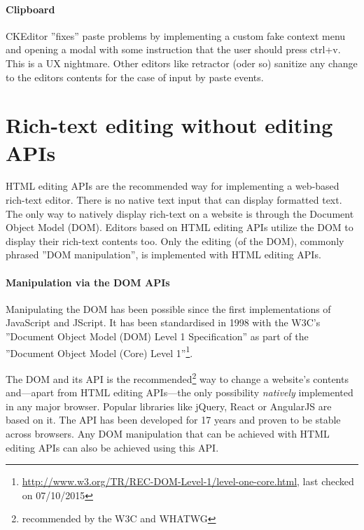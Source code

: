 \paragraph{Clipboard} CKEditor ''fixes'' paste problems by implementing a custom fake context menu and opening a modal with some instruction that the user should press ctrl+v. This is a UX nightmare. Other editors like retractor (oder so) sanitize any change to the editors contents for the case of input by paste events.

\section{Rich-text editing without editing APIs}

HTML editing APIs are the recommended way for implementing a web-based rich-text editor. There is no native text input that can display formatted text. The only way to natively display rich-text on a website is through the Document Object Model (DOM). Editors based on HTML editing APIs utilize the DOM to display their rich-text contents too. Only the editing (of the DOM), commonly phrased ''DOM manipulation'', is implemented with HTML editing APIs.

\paragraph{Manipulation via the DOM APIs} Manipulating the DOM has been possible since the first implementations of JavaScript and JScript. It has been standardised in 1998 with the W3C's ''Document Object Model (DOM) Level 1 Specification'' as part of the ''Document Object Model (Core) Level 1''\footnote{\url{http://www.w3.org/TR/REC-DOM-Level-1/level-one-core.html}, last checked on 07/10/2015}.

The DOM and its API is the recommended\footnote{recommended by the W3C and WHATWG} way to change a website's contents and---apart from HTML editing APIs---the only possibility \textit{natively} implemented in any major browser. Popular libraries like jQuery, React or AngularJS are based on it. The API has been developed for 17 years and proven to be stable across browsers. Any DOM manipulation that can be achieved with HTML editing APIs can also be achieved using this API.


